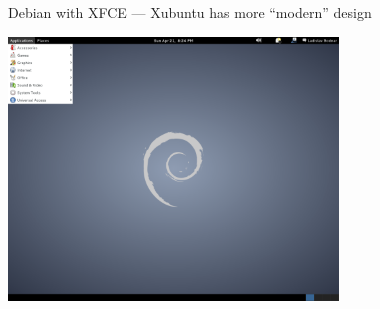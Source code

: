 \documentclass[compress, ucs, xelatex, 11pt, xcolor=svgnames,
  hyperref={
    bookmarks=true,
    unicode=true,
    colorlinks=true,
    pdftitle={Linux, command line and MetaCentrum},
    plainpages=false,
    pdfauthor={Vojtech Zeisek},
    pdfsubject={Course about use of Linux command line, writing shell scripts and using MetaCentrum of CESNET},
    pdfcreator={XeLaTeX},
    pdfkeywords={Linux, GNU, BASH, shell, command line, MetaCentrum},
    linkcolor=DarkRed,
    anchorcolor=DarkBlue,
    citecolor=Indigo,
    filecolor=NavyBlue,
    menucolor=DarkMagenta,
    urlcolor=DarkBlue,
    pdftex},
  url={hyphens, lowtilde} %
  ]{beamer}
\begin{document}
\begin{frame}{Debian with XFCE --- Xubuntu has more ``modern'' design} %
  \begin{center}
    \includegraphics[height=7cm]{debian.png}
  \end{center}
\end{frame}

\end{document}

